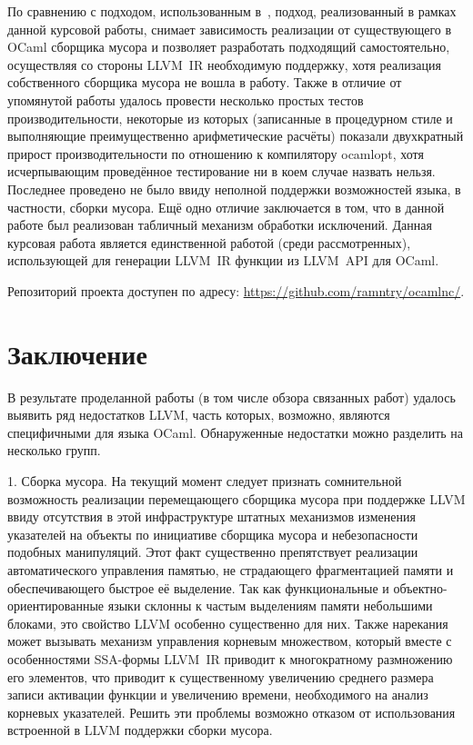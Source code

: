 \documentclass[a4paper, 12pt]{article}
\begin{document}
По сравнению с подходом, использованным в~\cite{Benner}, подход, реализованный в рамках данной курсовой работы,
снимает зависимость реализации от существующего в OCaml сборщика мусора и позволяет разработать подходящий
самостоятельно, осуществляя со стороны LLVM~IR необходимую поддержку, хотя реализация собственного сборщика мусора не
вошла в работу. Также в отличие от упомянутой работы удалось провести несколько простых тестов производительности,
некоторые из которых (записанные в процедурном стиле и выполняющие преимущественно арифметические расчёты) показали
двухкратный прирост производительности по отношению к компилятору ocamlopt, хотя исчерпывающим проведённое тестирование
ни в коем случае назвать нельзя. Последнее проведено не было ввиду неполной поддержки возможностей языка, в
частности, сборки мусора. Ещё одно отличие заключается в том, что в данной работе был реализован табличный механизм
обработки исключений. Данная курсовая работа является единственной работой (среди рассмотренных), использующей для
генерации LLVM~IR функции из LLVM~API для OCaml.

Репозиторий проекта доступен по адресу: \url{https://github.com/ramntry/ocamlnc/}.

\newpage
\section*{Заключение}

В результате проделанной работы (в том числе обзора связанных работ) удалось выявить ряд недостатков LLVM, часть
которых, возможно, являются специфичными для языка OCaml. Обнаруженные недостатки можно разделить на несколько групп.

1. Сборка мусора.
На текущий момент следует признать сомнительной возможность реализации перемещающего сборщика мусора при поддержке
LLVM ввиду отсутствия в этой инфраструктуре штатных механизмов изменения указателей на объекты по инициативе сборщика
мусора и небезопасности подобных манипуляций. Этот факт существенно препятствует
реализации автоматического управления памятью, не страдающего фрагментацией памяти и обеспечивающего быстрое её
выделение. Так как функциональные и объектно-ориентированные языки склонны к частым выделениям памяти небольшими
блоками, это свойство LLVM особенно существенно для них. Также нарекания может вызывать механизм управления корневым
множеством, который вместе с особенностями SSA-формы LLVM~IR приводит к многократному размножению его элементов, что
приводит к существенному увеличению среднего размера записи активации функции и увеличению времени, необходимого на
анализ корневых указателей. Решить эти проблемы возможно отказом от использования встроенной в LLVM поддержки сборки
мусора.
\end{document}
